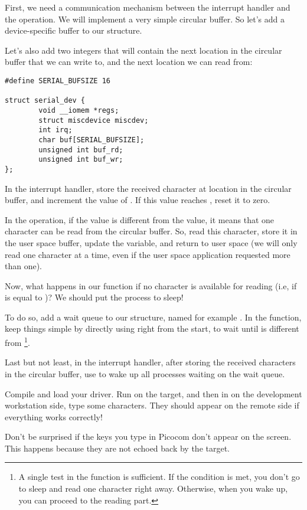 First, we need a communication mechanism between the interrupt handler
and the  operation. We will implement a very simple
circular buffer. So let's add a device-specific buffer to our
 structure.

Let's also add two integers that will contain the next location
in the circular buffer that we can write to, and the next location
we can read from:

\begin{verbatim}
#define SERIAL_BUFSIZE 16

struct serial_dev {
        void __iomem *regs;
        struct miscdevice miscdev;
        int irq;
        char buf[SERIAL_BUFSIZE];
        unsigned int buf_rd;
        unsigned int buf_wr;
};
\end{verbatim}

In the interrupt handler, store the received character at location
 in the circular buffer, and increment the value
of . If this value reaches ,
reset it to zero.

In the  operation, if the  value is
different from the  value, it means that one
character can be read from the circular buffer. So, read this
character, store it in the user space buffer, update the
 variable, and return to user space (we will only
read one character at a time, even if the user space application
requested more than one).

Now, what happens in our  function if no character is
available for reading (i.e, if  is equal to
)? We should put the process to sleep!

To do so, add a  wait queue to our
 structure, named for example . In the
 function, keep things simple by directly using
 right from the start, to wait until
 is different from \footnote{A single test in the
 function is sufficient. If the
condition is met, you don't go to sleep and read one character right away.
Otherwise, when you wake up, you can proceed to the reading part.}.

Last but not least, in the interrupt handler,
after storing the received characters in the circular buffer, use
 to wake up all processes waiting on the wait queue.

Compile and load your driver. Run 
on the target, and then in  on the development
workstation side, type some characters. They should appear on the
remote side if everything works correctly!

Don't be surprised if the keys you type in Picocom don't appear on the
screen. This happens because they are not echoed back by the target.
